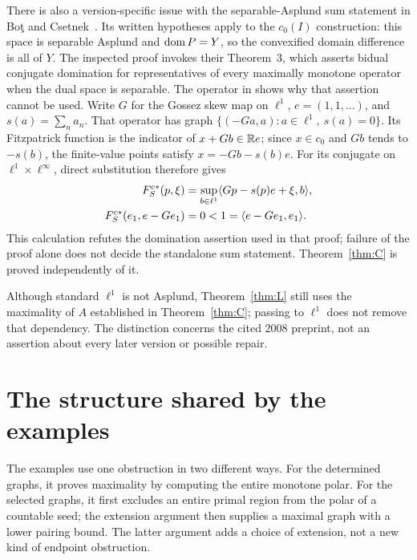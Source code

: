 There is also a version-specific issue with the separable-Asplund sum
statement in Bo\c{t} and Csetnek~\cite[Corollary~11]{botcsetnek2008}.
Its written hypotheses apply to the $c_0(I)$ construction: this space
is separable Asplund and $\operatorname{dom} P=Y$, so the convexified domain difference
is all of $Y$. The inspected proof invokes their Theorem~3, which asserts
bidual conjugate domination for representatives of every maximally
monotone operator when the dual space is separable. The operator in
\cite[author version, Lemma~2.1]{buenosvaiter2011} shows why that assertion cannot be used.
Write $G$ for the Gossez skew map on $\ell^1$, $e=(1,1,\ldots)$, and
$s(a)=\sum_n a_n$. That operator has graph
$\{(-Ga,a):a\in\ell^1,\ s(a)=0\}$. Its Fitzpatrick function is the
indicator of $x+Gb\in\mathbb R e$; since $x\in c_0$ and $Gb$ tends to $-s(b)$,
the finite-value points satisfy $x=-Gb-s(b)e$. For its conjugate on
$\ell^1\times\ell^\infty$, direct substitution therefore gives
\begin{equation}
\begin{aligned}
F_S^{c*}(p,\xi)
 &=\sup_{b\in\ell^1}\langle Gp-s(p)e+\xi,b\rangle,\\
F_S^{c*}(e_1,e-Ge_1)&=0<1=\langle e-Ge_1,e_1\rangle.
\end{aligned}
\label{eq:bidual-interface}
\end{equation}
This calculation refutes the domination assertion used in that proof;
failure of the proof alone does not decide the standalone sum statement.
Theorem~\ref{thm:C} is proved independently of it.

Although standard
$\ell^1$ is not Asplund, Theorem~\ref{thm:L} still uses the maximality
of $A$ established in Theorem~\ref{thm:C}; passing to $\ell^1$ does not
remove that dependency. The distinction concerns the cited 2008 preprint,
not an assertion about every later version or possible repair.



\section{The structure shared by the examples}
\label{sec:structure}
The examples use one obstruction in two different ways. For the determined
graphs, it proves maximality by computing the entire monotone polar. For
the selected graphs, it first excludes an entire primal region from the
polar of a countable seed; the extension argument then supplies a maximal
graph with a lower pairing bound. The latter argument adds a choice of
extension, not a new kind of endpoint obstruction.

